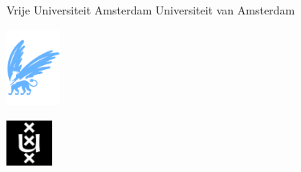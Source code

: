 \begin{titlepage}
    \begin{addmargin}[-1cm]{-3cm}

%
%
%
%
%
%
%
%
%
%

    \begin{center}

    Vrije Universiteit Amsterdam \hspace*{2cm} Universiteit van Amsterdam

    \vspace{1mm}

    \hspace*{-7.5cm}\includegraphics[height=25mm]{figures/vu-griffioen.pdf}

    \vspace*{-2cm}\hspace*{7.5cm}\includegraphics[height=15mm]{figures/uva_logo.jpg}

    \vspace{2cm}


\end{center}
\end{addmargin}
\end{titlepage}

